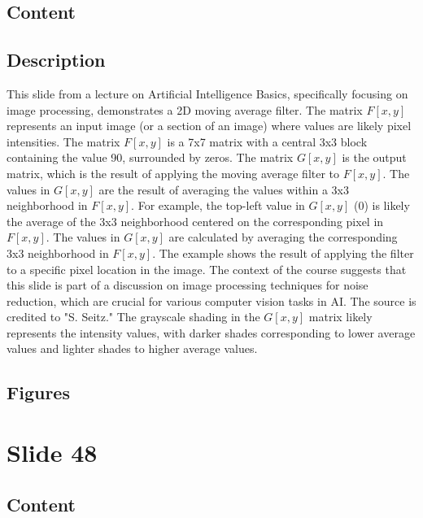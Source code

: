\documentclass{article}%
\begin{document}
\subsection{Content}%
%
\subsection{Description}%
This slide from a lecture on Artificial Intelligence Basics, specifically focusing on image processing, demonstrates a 2D moving average filter.  The matrix $F[x, y]$ represents an input image (or a section of an image) where values are likely pixel intensities.  The matrix $F[x, y]$ is a 7x7 matrix with a central 3x3 block containing the value 90, surrounded by zeros.  The matrix $G[x, y]$ is the output matrix, which is the result of applying the moving average filter to $F[x, y]$.  The values in $G[x, y]$ are the result of averaging the values within a 3x3 neighborhood in $F[x, y]$.  For example, the top-left value in $G[x, y]$ (0) is likely the average of the 3x3 neighborhood centered on the corresponding pixel in $F[x, y]$.  The values in $G[x, y]$ are calculated by averaging the corresponding 3x3 neighborhood in $F[x, y]$.  The example shows the result of applying the filter to a specific pixel location in the image.  The context of the course suggests that this slide is part of a discussion on image processing techniques for noise reduction, which are crucial for various computer vision tasks in AI. The source is credited to "S. Seitz."  The grayscale shading in the $G[x, y]$ matrix likely represents the intensity values, with darker shades corresponding to lower average values and lighter shades to higher average values.%
\subsection{Figures}%
\begin{figure}[H]%
\centering%
\end{figure}

%
\newpage%
\section{Slide 48}%
\label{sec:Slide48}%
\subsection{Content}%
%
\end{document}
